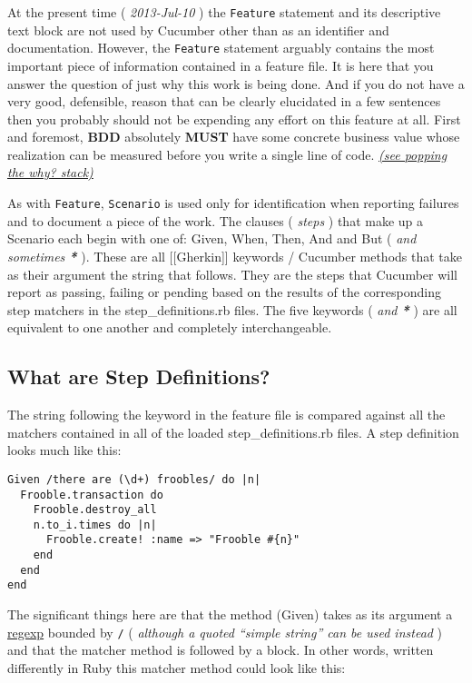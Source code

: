 At the present time ( \emph{2013-Jul-10} ) the \verb+Feature+ statement and its descriptive text block are not used by Cucumber other than as an identifier and documentation.  However, the \verb+Feature+ statement arguably contains the most important piece of information contained in a feature file.  It is here that you answer the question of just why this work is being done.  And if you do not have a very good, defensible, reason that can be clearly elucidated in a few sentences then you probably should not be expending any effort on this feature at all.  First and foremost, \textbf{BDD} absolutely \textbf{MUST} have some concrete business value whose realization can be measured before you write a single line of code. \emph{\href{http://www.mattblodgett.com/2009/01/pop-stack.html}{(see popping the why? stack)}}

As with \verb+Feature+, \verb+Scenario+ is used only for identification when reporting failures and to document a piece of the work.  The clauses ( \emph{steps} ) that make up a Scenario each begin with one of: Given, When, Then, And and But ( \emph{ and sometimes \textbf{*}} ).  These are all [[Gherkin]] keywords / Cucumber methods that take as their argument the string that follows.  They are the steps that Cucumber will report as passing, failing or pending based on the results of the corresponding step matchers in the step\_definitions.rb files.  The five keywords ( \emph{ and \textbf{*}} ) are all equivalent to one another and completely interchangeable.

\subsection{What are Step Definitions?}

The string following the keyword in the feature file is compared against all the matchers contained in all of the loaded step\_definitions.rb files.  A step definition looks much like this:
\begin{verbatim}
Given /there are (\d+) froobles/ do |n|
  Frooble.transaction do
    Frooble.destroy_all
    n.to_i.times do |n|
      Frooble.create! :name => "Frooble #{n}"
    end
  end
end

\end{verbatim}

The significant things here are that the method (Given) takes as its argument a \href{http://en.wikipedia.org/wiki/Regexp}{regexp} bounded by  \verb+/+ ( \emph{although a quoted ``simple string'' can be used instead} ) and that the matcher method is followed by a block.  In other words, written differently in Ruby this matcher method could look like this:

